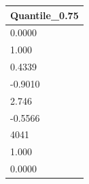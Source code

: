 \begin{tabular}{l}
\toprule
Quantile\_0.75 \\
\midrule
0.0000 \\
1.000 \\
0.4339 \\
-0.9010 \\
2.746 \\
-0.5566 \\
4041 \\
1.000 \\
0.0000 \\
\bottomrule
\end{tabular}